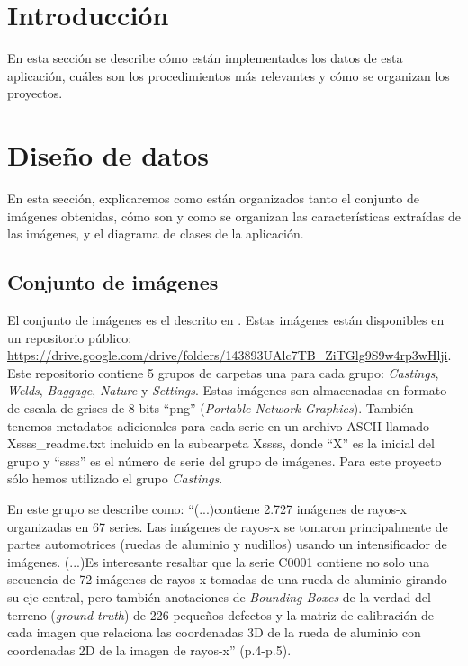 
\section{Introducción}

En esta sección se describe cómo están implementados los datos de esta aplicación, cuáles son los procedimientos más relevantes y cómo se organizan los proyectos.

\section{Diseño de datos}

En esta sección, explicaremos como están organizados tanto el conjunto de imágenes obtenidas, cómo son y como se organizan las características extraídas de las imágenes, y el diagrama de clases de la aplicación.

\subsection{Conjunto de imágenes}

El conjunto de imágenes es el descrito en \cite{GDXray:imagenes}. Estas imágenes están disponibles en un repositorio público: \url{https://drive.google.com/drive/folders/143893UAlc7TB_ZiTGlg9S9w4rp3wHlji}. Este repositorio contiene 5 grupos de carpetas una para cada grupo: \textit{Castings}, \textit{Welds}, \textit{Baggage}, \textit{Nature} y \textit{Settings}. Estas imágenes son almacenadas en formato de escala de grises de 8 bits ``png'' (\textit{Portable Network Graphics}). También tenemos metadatos adicionales para cada serie en un archivo ASCII llamado Xssss\_readme.txt incluido en la subcarpeta Xssss, donde ``X'' es la inicial del grupo y ``ssss'' es el número de serie del grupo de imágenes. Para este proyecto sólo hemos utilizado el grupo \textit{Castings}.

En \cite{GDXray:imagenes} este grupo se describe como: ``(...)contiene 2.727 imágenes de rayos-x organizadas en 67 series. Las imágenes de rayos-x se tomaron principalmente de partes automotrices (ruedas de aluminio y nudillos) usando un intensificador de imágenes. (...)Es interesante resaltar que la serie C0001 contiene no solo una secuencia de 72 imágenes de rayos-x tomadas de una rueda de aluminio girando su eje central, pero también anotaciones de \textit{Bounding Boxes} de la verdad del terreno (\textit{ground truth}) de 226 pequeños defectos y la matriz de calibración de cada imagen que relaciona las coordenadas 3D de la rueda de aluminio con coordenadas 2D de la imagen de rayos-x'' (p.4-p.5).

